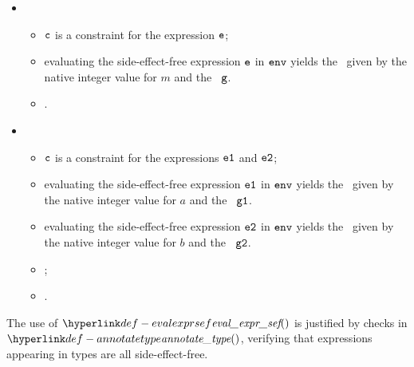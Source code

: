 \ProseParagraph
\OneApplies
\begin{itemize}
  \item {}
  \begin{itemize}
    \item $\vc$ is a constraint for the expression $\ve$;
    \item evaluating the side-effect-free expression $\ve$ in $\env$ yields the \concurrentnativevalue\ given
          by the native integer value for $m$ and the \executiongraph\ $\vg$\ProseOrError.
    \item {}.
  \end{itemize}

  \item {}
  \begin{itemize}
    \item $\vc$ is a constraint for the expressions $\veone$ and $\vetwo$;
    \item evaluating the side-effect-free expression $\veone$ in $\env$ yields the \concurrentnativevalue\ given
          by the native integer value for $a$ and the \executiongraph\ $\vgone$\ProseOrError.
    \item evaluating the side-effect-free expression $\vetwo$ in $\env$ yields the \concurrentnativevalue\ given
          by the native integer value for $b$ and the \executiongraph\ $\vgtwo$\ProseOrError.
    \item {};
    \item {}.
  \end{itemize}
\end{itemize}

\FormallyParagraph
The use of $\evalexprsef$ is justified by checks in $\annotatetype$, verifying
that expressions appearing in types are all side-effect-free.

\begin{mathpar}
\end{mathpar}

\begin{mathpar}
\end{mathpar}

